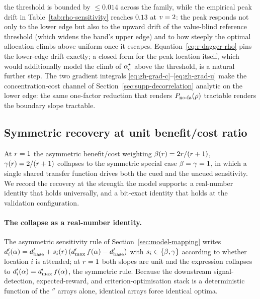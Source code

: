 the threshold is bounded by $\le 0.014$ across the family, while the
empirical peak drift in Table~\ref{tab:rho-sensitivity} reaches $0.13$ at
$v = 2$: the peak responds not only to the lower edge but also to the
upward drift of the value-blind reference threshold (which widens the
band's upper edge) and to how steeply the optimal allocation climbs above
uniform once it escapes. Equation~\eqref{eq:r-dagger-rho} pins the
lower-edge drift exactly; a closed form for the peak location itself,
which would additionally model the climb of $\alpha_c^\star$ above the
threshold, is a natural further step. The two gradient integrals
\eqref{eq:gh-grad-c}--\eqref{eq:gh-grad-u} make the concentration-cost
channel of Section~\ref{sec:supp-decorrelation} analytic on the lower
edge: the same one-factor reduction that renders $P_{\mathrm{no\text{-}fa}}(\rho)$
tractable renders the boundary slope tractable.

\subsection{Symmetric recovery at unit benefit/cost ratio}
\label{sec:supp-symmetric}

At $r = 1$ the asymmetric benefit/cost weighting
$\beta(r) = 2r/(r + 1)$,
$\gamma(r) = 2/(r + 1)$ collapses to the symmetric special case
$\beta = \gamma = 1$, in which a single shared transfer function drives
both the cued and the uncued sensitivity. We record the recovery at the
strength the model supports: a real-number identity that holds
universally, and a bit-exact identity that holds at the validation
configuration.

\paragraph{The collapse as a real-number identity.}
The asymmetric sensitivity rule of Section~\ref{sec:model-mapping} writes
$d'_i(\alpha) = d'_{\mathrm{base}} + s_i(r)\,
(d'_{\max}\, f(\alpha) - d'_{\mathrm{base}})$ with
$s_i \in \{\beta, \gamma\}$ according to whether location $i$ is
attended; at $r = 1$ both slopes are unit and the expression
collapses to $d'_i(\alpha) = d'_{\max}\, f(\alpha)$, the symmetric
rule. Because the downstream signal-detection, expected-reward, and
criterion-optimisation stack is a deterministic function of the
$\dprime$ arrays alone, identical arrays force identical optima.

